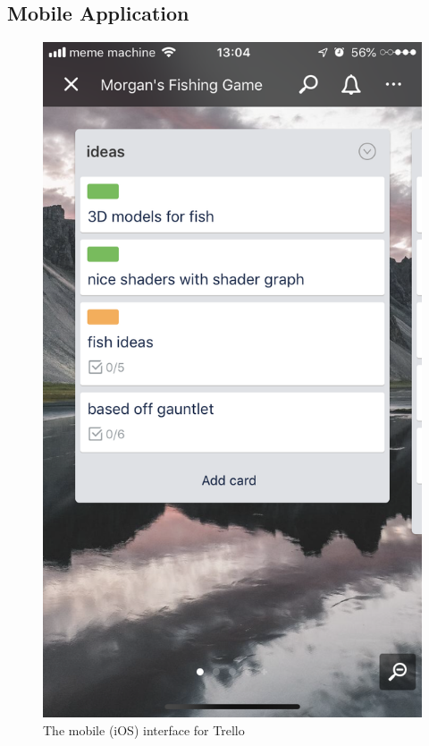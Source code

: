 \documentclass{scrartcl}
\begin{document}
\subsection*{Mobile Application}
\begin{figure}[h]
    \centering
    \includegraphics[scale=0.2]{images/trellomobile.png}
    \caption{The mobile (iOS) interface for Trello}
\end{figure}
\end{document}
